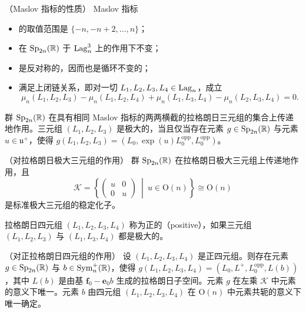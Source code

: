 
\begin{proposition}[11.13]（Maslov 指标的性质）
Maslov 指标
\begin{itemize}
\item 的取值范围是 $\{-n,-n+2,\dots,n\}$；
\item 在 $\operatorname{Sp}_{2n}(\mathbb{R})$ 于 $\operatorname{Lag}_n^{3}$ 上的作用下不变；
\item 是反对称的，因而也是循环不变的；
\item 满足上闭链关系，即对一切 $L_1,L_2,L_3,L_4\in\operatorname{Lag}_n$，成立
\[
\mu_n(L_1,L_2,L_3)-\mu_n(L_1,L_2,L_4)+\mu_n(L_1,L_3,L_4)-\mu_n(L_2,L_3,L_4)=0.
\]
\end{itemize}
群 $\operatorname{Sp}_{2n}(\mathbb{R})$ 在具有相同 Maslov 指标的两两横截的拉格朗日三元组的集合上传递地作用。三元组 $(L_1,L_2,L_3)$ 是极大的，当且仅当存在元素 $g\in\operatorname{Sp}_{2n}(\mathbb{R})$ 与元素 $u\in\mathfrak{u}^{+}$，使得 $g(L_1,L_2,L_3)=(L_0,\exp(u)L_0^{\mathrm{opp}},L_0^{\mathrm{opp}})$。
\end{proposition}

\begin{proposition}[11.14]（对拉格朗日极大三元组的作用）
群 $\operatorname{Sp}_{2n}(\mathbb{R})$ 在拉格朗日极大三元组上传递地作用，且
\[
\mathcal{K}=\left\{\begin{pmatrix} u & 0\\ 0 & u\end{pmatrix}\ \middle|\ u\in\mathrm{O}(n)\right\}\cong\mathrm{O}(n)
\]
是标准极大三元组的稳定化子。
\end{proposition}

\begin{definition}[11.15]
拉格朗日四元组 $(L_1,L_2,L_3,L_4)$ 称为正的（positive），如果三元组 $(L_1,L_2,L_3)$ 与 $(L_1,L_3,L_4)$ 都是极大的。
\end{definition}

\begin{proposition}[11.16]（对正拉格朗日四元组的作用）
设 $(L_1,L_2,L_3,L_4)$ 是正四元组。则存在元素 $g\in\operatorname{Sp}_{2n}(\mathbb{R})$ 与 $b\in\operatorname{Sym}_n^{+}(\mathbb{R})$，使得 $g(L_1,L_2,L_3,L_4)=(L_0,L^{+},L_0^{\mathrm{opp}},L(b))$，其中 $L(b)$ 是由基 $\mathbf{f}_0-\mathbf{e}_0 b$ 生成的拉格朗日子空间。元素 $g$ 在左乘 $\mathcal{K}$ 中元素的意义下唯一。元素 $b$ 由四元组 $(L_1,L_2,L_3,L_4)$ 在 $\mathrm{O}(n)$ 中元素共轭的意义下唯一确定。
\end{proposition}


